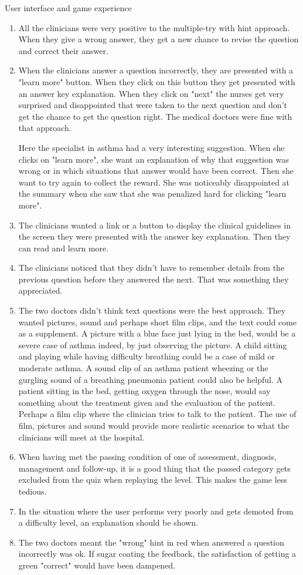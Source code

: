 User interface and game experience
 \begin{enumerate}
 	\item All the clinicians were very positive to the multiple-try with hint approach. When they give a wrong answer, they get a new chance to revise the question and correct their answer.
 	\item When the clinicians answer a question incorrectly, they are presented with a "learn more" button. When they click on this button they get presented with an answer key explanation. When they click on "next" the nurses get very surprised and disappointed that were taken to the next question and don't get the chance to get the question right. The medical doctors were fine with that approach.
 	
 	Here the specialist in asthma had a very interesting suggestion. When she clicks on "learn more", she want an explanation of why that suggestion was wrong or in which situations that answer would have been correct. Then she want to try again to collect the reward. She was noticeably disappointed at the summary when she saw that she was penalized hard for clicking "learn more".
 	\item The clinicians wanted a link or a button to display the clinical guidelines in the screen they were presented with the answer key explanation. Then they can read and learn more.
 	\item The clinicians noticed that they didn't have to remember details from the previous question before they answered the next. That was something they appreciated.
 	\item The two doctors didn't think text questions were the best approach. They wanted pictures, sound and perhaps short film clips, and the text could come as a supplement. A picture with a blue face just lying in the bed, would be a severe case of asthma indeed, by just observing the picture. A child sitting and playing while having difficulty breathing could be a case of mild or moderate asthma. A sound clip of an asthma patient wheezing or the gurgling sound of a breathing pneumonia patient could also be helpful. A patient sitting in the bed, getting oxygen through the nose, would say something about the treatment given and the evaluation of the patient. Perhaps a film clip where the clinician tries to talk to the patient. The use of film, pictures and sound would provide more realistic scenarios to what the clinicians will meet at the hospital.
 	\item When having met the passing condition of one of assessment, diagnosis, management and follow-up, it is a good thing that the passed category gets excluded from the quiz when replaying the level. This makes the game less tedious.
 	\item In the situation where the user performs very poorly and gets demoted from a difficulty level, an explanation should be shown.
 	\item The two doctors meant the "wrong" hint in red when answered a question incorrectly was ok. If sugar coating the feedback, the satisfaction of getting a green "correct" would have been dampened.
\end{enumerate}

